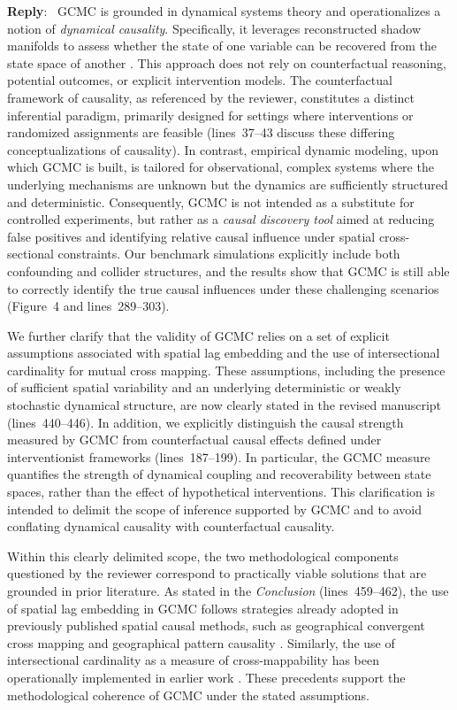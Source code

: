 \documentclass[11pt]{article}
\newcounter{reviewer}
\newenvironment{reply}
   {\medskip \noindent \color{blue} \begin{sf}\textbf{Reply}:\  }
   {\medskip \par \end{sf}}
\begin{document}
\begin{reply}
GCMC is grounded in dynamical systems theory and operationalizes a notion of \textit{dynamical causality}. Specifically, it leverages reconstructed shadow manifolds to assess whether the state of one variable can be recovered from the state space of another \citep{sugihara2012ccm,gao2023gccm,tao2025cmc}. This approach does not rely on counterfactual reasoning, potential outcomes, or explicit intervention models. The counterfactual framework of causality, as referenced by the reviewer, constitutes a distinct inferential paradigm, primarily designed for settings where interventions or randomized assignments are feasible (lines~37--43 discuss these differing conceptualizations of causality). In contrast, empirical dynamic modeling, upon which GCMC is built, is tailored for observational, complex systems where the underlying mechanisms are unknown but the dynamics are sufficiently structured and deterministic. Consequently, GCMC is not intended as a substitute for controlled experiments, but rather as a \textit{causal discovery tool} aimed at reducing false positives and identifying relative causal influence under spatial cross-sectional constraints. Our benchmark simulations explicitly include both confounding and collider structures, and the results show that GCMC is still able to correctly identify the true causal influences under these challenging scenarios (Figure~4 and lines~289--303).

We further clarify that the validity of GCMC relies on a set of explicit assumptions associated with spatial lag embedding and the use of intersectional cardinality for mutual cross mapping. These assumptions, including the presence of sufficient spatial variability and an underlying deterministic or weakly stochastic dynamical structure, are now clearly stated in the revised manuscript (lines~440--446). In addition, we explicitly distinguish the causal strength measured by GCMC from counterfactual causal effects defined under interventionist frameworks (lines~187--199). In particular, the GCMC measure quantifies the strength of dynamical coupling and recoverability between state spaces, rather than the effect of hypothetical interventions. This clarification is intended to delimit the scope of inference supported by GCMC and to avoid conflating dynamical causality with counterfactual causality.

Within this clearly delimited scope, the two methodological components questioned by the reviewer correspond to practically viable solutions that are grounded in prior literature. As stated in the \textit{Conclusion} (lines~459--462), the use of spatial lag embedding in GCMC follows strategies already adopted in previously published spatial causal methods, such as geographical convergent cross mapping and geographical pattern causality \citep{gao2023gccm,zhang2025gpc}. Similarly, the use of intersectional cardinality as a measure of cross-mappability has been operationally implemented in earlier work \citep{tao2025cmc}. These precedents support the methodological coherence of GCMC under the stated assumptions.


\end{reply}
\end{document}
